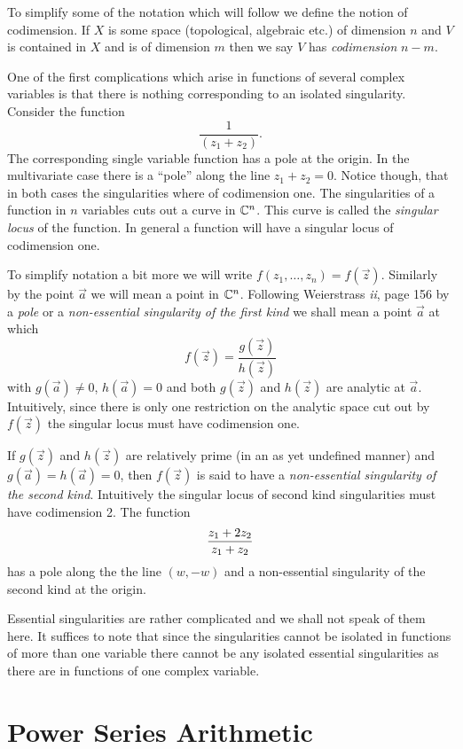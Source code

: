 To simplify some of the notation which will follow we define the
notion of codimension.  If $X$ is some space (topological, algebraic etc.)
of dimension $n$ and $V$ is contained in $X$ and is of dimension $m$
then we say $V$ has {\em codimension} $n - m$.

One of the first complications which arise in functions of
several complex variables is that there is nothing corresponding to
an isolated singularity.  Consider the function
\[
\frac{1}{(z_1 + z_2)}.
\]
The corresponding single variable function has a pole at the origin.  In the
multivariate case there is a ``pole'' along the line $z_{1} + z_{2} = 0$.
Notice though, that in both cases the singularities where of codimension
one.  The singularities of a function in $n$ variables cuts out a curve 
in $\mathbb{C} ^n$.  This curve is called the {\em singular locus} of the function.
In general a function will have a singular locus of codimension one.

To simplify notation a bit more we will write 
$f(z_1,\ldots, z_n) = f(\vec z)$.  Similarly by the point $\vec a$ we will
mean a point in $\mathbb{C}^n$.
Following Weierstrass \cite{Weier95} {\em  ii}, page 156 by a {\em pole} or a
{\em non-essential singularity of the first kind} we shall mean a
point $\vec a$ at which
\[
f(\vec z) = \frac{g(\vec z)}{h(\vec z)}
\]
with $g(\vec a) \not= 0$, $h(\vec a) = 0$ and both $g(\vec z)$ and $h(\vec z)$
are analytic at $\vec a$.  Intuitively, since there is only one restriction on
the analytic space cut out by $f(\vec z)$ the singular locus must have 
codimension one.

If $g(\vec z)$ and $h(\vec z)$ are relatively prime (in an as yet
undefined manner) and $g(\vec a) = h(\vec a) = 0$, then $f(\vec z)$ is 
said to have a {\em non-essential singularity of the second kind\/}.
Intuitively the singular locus of second kind singularities must have
codimension 2.   The function 
\[
{z_1 + 2 z_2 \over z_1 + z_2}
\]
has a pole along the the line $(w, -w)$ and a non-essential singularity
of the second kind at the origin.

Essential singularities are rather complicated and we shall not
speak of them here.  It suffices to note that since the singularities cannot be
isolated in functions of more than one variable there cannot be any isolated
essential singularities as there are in functions of one complex variable.

\section{Power Series Arithmetic}

